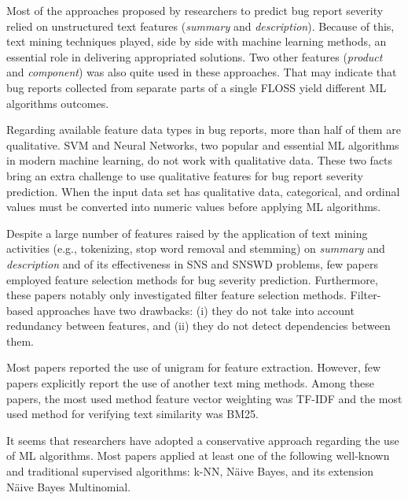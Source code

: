 Most of the approaches proposed by researchers to predict bug report severity relied on unstructured text features (\textit{summary} and \textit{description}). Because of this, text mining techniques played, side by side with machine learning methods, an essential role in delivering appropriated solutions. Two other features (\textit{product} and \textit{component}) was also quite used in these approaches. That may indicate that bug reports collected from separate parts of a single FLOSS yield different ML algorithms outcomes.

Regarding available feature data types in bug reports, more than half of them are qualitative. SVM and Neural Networks, two popular and essential ML algorithms in modern machine learning\cite{Marsland:2014}, do not work with qualitative data\cite{Flach:2012}. These two facts bring an extra challenge to use qualitative features for bug report severity prediction. When the input data set has qualitative data,  categorical, and ordinal values must be converted into numeric values before applying ML algorithms.

Despite a large number of features raised by the application of text mining activities (e.g., tokenizing, stop word removal and stemming) on \textit{summary} and \textit{description} and of its effectiveness in SNS and SNSWD problems\cite{Yang:2012}, few papers employed feature selection methods for bug severity prediction. Furthermore, these papers notably only investigated filter feature selection methods. Filter-based approaches have two drawbacks\cite{Flach:2012}: (i) they do not take into account redundancy between features, and (ii) they do not detect dependencies between them. 

Most papers reported the use of unigram for feature extraction. However, few papers explicitly report the use of another text ming methods. Among these papers, the most used method feature vector weighting was TF-IDF and the most used method for verifying text similarity was BM25.


It seems that researchers have adopted a conservative approach regarding the use of ML algorithms. Most papers applied at least one of the following well-known and traditional supervised algorithms: k-NN, Näive Bayes, and its extension Näive Bayes Multinomial.

